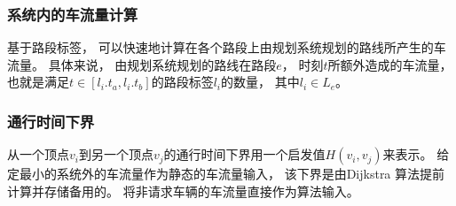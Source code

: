 \subsubsection*{系统内的车流量计算}
 基于路段标签， 可以快速地计算在各个路段上由规划系统规划的路线所产生的车流量。 具体来说， 由规划系统规划的路线在路段$e$， 时刻$t$所额外造成的车流量， 也就是满足$ t \in [l_i.t_a, l_i.t_b]$的路段标签$l_i$的数量， 其中$l_i \in L_e$。


\subsubsection*{通行时间下界}
从一个顶点$v_i$到另一个顶点$v_j$的通行时间下界用一个启发值$H(v_i,v_j)$来表示。 给定最小的系统外的车流量作为静态的车流量输入， 该下界是由Dijkstra 算法提前计算并存储备用的。 将非请求车辆的车流量直接作为算法输入。




